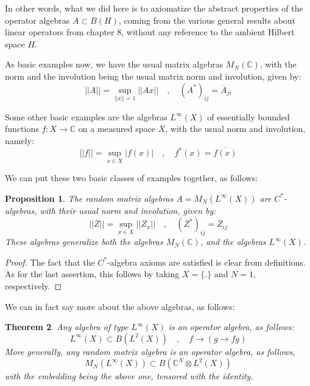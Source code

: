 \documentclass[12pt]{amsbook}
\newtheorem{theorem}{Theorem}[chapter]
\newtheorem{proposition}[theorem]{Proposition}
\begin{document}
In other words, what we did here is to axiomatize the abstract properties of the operator algebras $A\subset B(H)$, coming from the various general results about linear operators from chapter 8, without any reference to the ambient Hilbert space $H$.

\bigskip

As basic examples now, we have the usual matrix algebras $M_N(\mathbb C)$, with the norm and the involution being the usual matrix norm and involution, given by:
$$||A||=\sup_{||x||=1}||Ax||\quad,\quad 
(A^*)_{ij}=\overline{A}_{ji}$$

Some other basic examples are the algebras $L^\infty(X)$ of essentially bounded functions $f:X\to\mathbb C$ on a measured space $X$, with the usual norm and involution, namely:
$$||f||=\sup_{x\in X}|f(x)|\quad,\quad 
f^*(x)=\overline{f(x)}$$

We can put these two basic classes of examples together, as follows:

\begin{proposition}
The random matrix algebras $A=M_N(L^\infty(X))$ are $C^*$-algebras, with their usual norm and involution, given by:
$$||Z||=\sup_{x\in X}||Z_x||\quad,\quad 
(Z^*)_{ij}=\overline{Z}_{ij}$$
These algebras generalize both the algebras $M_N(\mathbb C)$, and the algebras $L^\infty(X)$.
\end{proposition}

\begin{proof}
The fact that the $C^*$-algebra axioms are satisfied is clear from definitions. As for the last assertion, this follows by taking $X=\{.\}$ and $N=1$, respectively.
\end{proof}

We can in fact say more about the above algebras, as follows:

\begin{theorem}
Any algebra of type $L^\infty(X)$ is an operator algebra, as follows:
$$L^\infty(X)\subset B(L^2(X))\quad,\quad 
f\to(g\to fg)$$
More generally, any random matrix algebra is an operator algebra, as follows,
$$M_N(L^\infty(X))\subset B\left(\mathbb C^N\otimes L^2(X)\right)$$
with the embedding being the above one, tensored with the identity.
\end{theorem}
\end{document}
